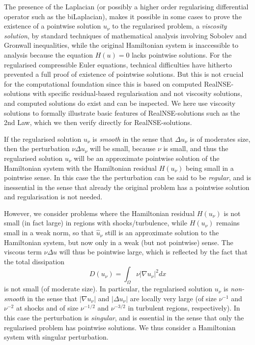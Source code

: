 The presence of the Laplacian (or possibly a higher order 
regularising differential operator such as the biLaplacian),
makes it possible in some cases to prove the existence of a 
pointwise solution $u_\nu$ to the regularised problem, 
a \emph{viscosity solution}, by standard techniques of mathematical 
analysis involving Sobolev and Gronwall inequalities, while  
the original Hamiltonian system is inaccessible to analysis
because the equation $H(u)=0$ lacks pointwise solutions.
For the regularised compressible Euler equations, technical
difficulties have hitherto prevented a full proof of existence of pointwise solutions.
But this is not crucial for the computational foundation 
since this is based on computed RealNSE-solutions with specific residual-based regularisation and not viscosity solutions, and
computed solutions do exist and can be inspected. 
We here use viscosity solutions to formally illustrate basic features of 
RealNSE-solutions such as the 2nd Law, which we then verify directly for 
RealNSE-solutions. 


If the regularised solution $u_\nu$ is \emph{smooth} in the sense that 
$\Delta u_\nu$
is of moderates size, then the perturbation $\nu\Delta u_\nu$ will be
small, because $\nu$ is small, and thus the regularised solution 
$u_\nu$ will be
an approximate pointwise solution of the Hamiltonian system 
with the Hamiltonian residual 
$H(u_\nu )$ being small in a pointwise sense. In this case the
the perturbation can be said to be \emph{regular}, and is inessential
in the sense that already the original problem has a pointwise solution
and regularisation is not needed. 
 
However, we consider problems where the Hamiltonian residual 
$H(u_\nu)$ is not small (in fact large) in regions with 
shocks/turbulence, 
while $H(u_\nu)$ remains small in a weak norm, so that
$\hat u_\nu$ still is an approximate solution
to the Hamiltonian system, but now only in a weak (but not pointwise)
sense.
The viscous term $\nu\Delta u$ will thus be pointwise large,
which is reflected by the fact that the total dissipation 
\[
D(u_\nu) =\int_\Omega \nu\vert\nabla u_\nu\vert^2dx
\]
is not small (of moderate size). In particular, the regularised 
solution $u_\nu$ is
\emph{non-smooth} in the sense that $\vert \nabla u_\nu\vert$ and
$\vert\Delta u_\nu\vert$ are locally
very large (of size $\nu^{-1}$ and $\nu^{-2}$ at shocks and of size 
$\nu^{-1/2}$ and $\nu^{-3/2}$
in turbulent regions, respectively). In this case the perturbation
is \emph{singular}, and is essential in the sense that
only the regularised problem has pointwise solutions. We thus
consider a Hamiltonian system with singular perturbation.

